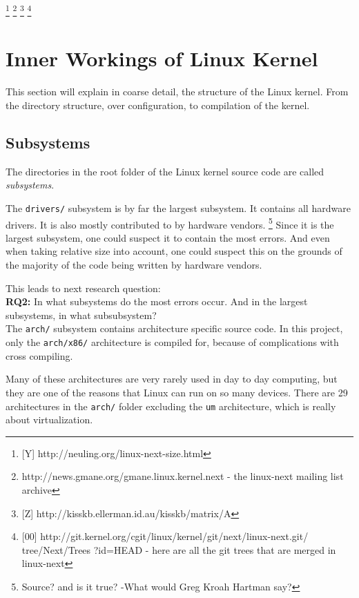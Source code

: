 \documentclass[a4paper,11pt]{report}
\newcommand{\textcode}[1]{
    \fboxsep=1pt
    \texttt{\colorbox{gray!20}{#1}}
}
\newcommand{\figa}{
    \begin{figure}[!htpb]
    \centering
}
\newcommand{\figb}[2]{
    \caption{#1}
    \label{#2}
    \end{figure}
}
\begin{document}
    \footnote{[Y] http://neuling.org/linux-next-size.html}
    \footnote{http://news.gmane.org/gmane.linux.kernel.next - the linux-next 
        mailing list archive}
    \footnote{[Z] http://kisskb.ellerman.id.au/kisskb/matrix/A}
    \footnote{ [00] 
        http://git.kernel.org/cgit/linux/kernel/git/next/linux-next.git/
        tree/Next/Trees ?id=HEAD - here are all the git trees that are merged 
        in linux-next}


        \section{Inner Workings of Linux Kernel}

This section will explain in coarse detail, the structure of the Linux kernel.
From the directory structure, over configuration, to compilation of the kernel.


        \subsection{Subsystems}

The directories in the root folder of the Linux kernel source code are called 
\emph{subsystems}. 


The \textcode{drivers/} subsystem is by far the largest subsystem. It contains 
all hardware drivers. It is also mostly contributed to by hardware vendors.
    \footnote{Source? and is it true? -What would Greg Kroah Hartman say?}
Since it is the largest subsystem, one could suspect it to contain the most 
errors. And even when taking relative size into account, one could suspect this
on the grounds of the majority of the code being written by hardware vendors.

This leads to next research question:
\\

\textbf{RQ2:} In what subsystems do the most errors occur. And in the largest 
subsystems, in what subsubsystem? 
\\


The \texttt{arch/} subsystem contains architecture specific source code. In 
this project, only the \texttt{arch/x86/} architecture is compiled for, 
because of complications with cross compiling.

Many of these architectures are very rarely used in day to day computing, but 
they are one of the reasons that Linux can run on so many devices. There are 29 
architectures in the \texttt{arch/} folder excluding the \texttt{um} 
architecture, which is really about virtualization.
\end{document}
